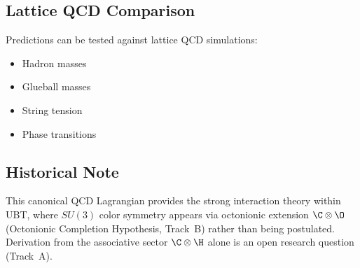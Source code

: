 \subsection{Lattice QCD Comparison}

Predictions can be tested against lattice QCD simulations:
\begin{itemize}
    \item Hadron masses
    \item Glueball masses
    \item String tension
    \item Phase transitions
\end{itemize}

\subsection{Historical Note}

This canonical QCD Lagrangian provides the strong interaction theory within UBT, where $SU(3)$ color symmetry appears via octonionic extension $\C \otimes \O$ (Octonionic Completion Hypothesis, Track~B) rather than being postulated. Derivation from the associative sector $\C \otimes \H$ alone is an open research question (Track~A).

